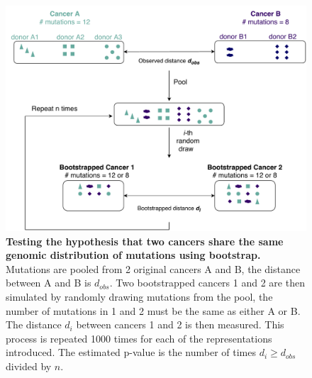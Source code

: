 \begin{figure}[ht!]
    \centering
    \includegraphics[scale=0.6]{graphics/bootstrap_demo.pdf}
    \caption{\textbf{Testing the hypothesis that two cancers share the same genomic distribution of mutations using bootstrap.} Mutations are pooled from 2 original cancers A and B, the distance between A and B is $d_{obs}$. Two bootstrapped cancers 1 and 2 are then simulated by randomly drawing mutations from the pool, the number of mutations in 1 and 2 must be the same as either A or B. The distance $d_i$ between cancers 1 and 2 is then measured. This process is repeated 1000 times for each of the representations introduced. The estimated p-value is the number of times $d_i \geqslant d_{obs}$ divided by $n$.}
    \label{fig:bootstrap_demo}
\end{figure}
